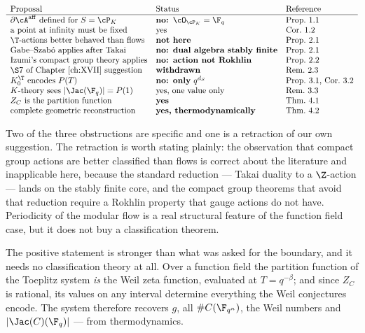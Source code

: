 \[
\begin{array}{lll}
\text{Proposal} & \text{Status} & \text{Reference}\\\hline
\partial\cA^{\mathrm{aff}}\ \text{defined for}\ S=\cP_K & \textbf{no: }\cO_{\cP_K}=\F_q & \text{Prop.~1.1}\\
\text{a point at infinity must be fixed} & \text{yes} & \text{Cor.~1.2}\\
\T\text{-actions better behaved than flows} & \textbf{not here} & \text{Prop.~2.1}\\
\text{Gabe--Szab\'o applies after Takai} & \textbf{no: dual algebra stably finite} & \text{Prop.~2.1}\\
\text{Izumi's compact group theory applies} & \textbf{no: action not Rokhlin} & \text{Prop.~2.2}\\
\text{\S7 of Chapter~\ref{ch:XVII} suggestion} & \textbf{withdrawn} & \text{Rem.~2.3}\\
K_0^\T\ \text{encodes}\ P(T) & \textbf{no: only}\ q^{d_S} & \text{Prop.~3.1, Cor.~3.2}\\
K\text{-theory sees}\ |\Jac(\F_q)|=P(1) & \text{yes, one value only} & \text{Rem.~3.3}\\
Z_C\ \text{is the partition function} & \textbf{yes} & \text{Thm.~4.1}\\
\text{complete geometric reconstruction} & \textbf{yes, thermodynamically} & \text{Thm.~4.2}
\end{array}
\]

Two of the three obstructions are specific and one is a retraction of our own suggestion. The
retraction is worth stating plainly: the observation that compact group actions are better
classified than flows is correct about the literature and inapplicable here, because the
standard reduction --- Takai duality to a $\Z$-action --- lands on the stably finite core,
and the compact group theorems that avoid that reduction require a Rokhlin property that
gauge actions do not have. Periodicity of the modular flow is a real structural feature of
the function field case, but it does not buy a classification theorem.

The positive statement is stronger than what was asked for the boundary, and it needs no
classification theory at all. Over a function field the partition function of the Toeplitz
system \emph{is} the Weil zeta function, evaluated at $T=q^{-\beta}$; and since $Z_C$ is
rational, its values on any interval determine everything the Weil conjectures encode. The
system therefore recovers $g$, all $\#C(\F_{q^n})$, the Weil numbers and $|\Jac(C)(\F_q)|$ ---
from thermodynamics.

